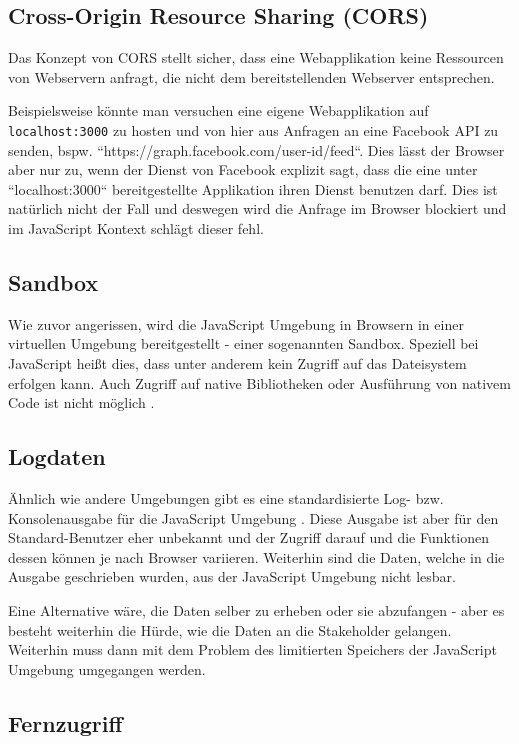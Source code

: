 \subsection{Cross-Origin Resource Sharing (CORS)}

Das Konzept von CORS stellt sicher, dass eine Webapplikation keine Ressourcen von Webservern anfragt, die nicht dem bereitstellenden Webserver entsprechen.

Beispielsweise könnte man versuchen eine eigene Webapplikation auf \texttt{localhost:3000} zu hosten und von hier aus Anfragen an eine Facebook API zu senden, bspw. ``https://graph.facebook.com/{user-id}/feed``. Dies lässt der Browser aber nur zu, wenn der Dienst von Facebook explizit sagt, dass die eine unter ``localhost:3000`` bereitgestellte Applikation ihren Dienst benutzen darf. Dies ist natürlich nicht der Fall und deswegen wird die Anfrage im Browser blockiert und im JavaScript Kontext schlägt dieser fehl.

\subsection{Sandbox}

Wie zuvor angerissen, wird die JavaScript Umgebung in Browsern in einer virtuellen Umgebung bereitgestellt - einer sogenannten Sandbox. Speziell bei JavaScript heißt dies, dass unter anderem kein Zugriff auf das Dateisystem erfolgen kann. Auch Zugriff auf native Bibliotheken oder Ausführung von nativem Code ist nicht möglich \cite{TheSpyInTheSandbox}.

\subsection{Logdaten}

Ähnlich wie andere Umgebungen gibt es eine standardisierte Log- bzw. Konsolenausgabe für die JavaScript Umgebung \cite{MDNConsole}. Diese Ausgabe ist aber für den Standard-Benutzer eher unbekannt und der Zugriff darauf und die Funktionen dessen können je nach Browser variieren. Weiterhin sind die Daten, welche in die Ausgabe geschrieben wurden, aus der JavaScript Umgebung nicht lesbar.

Eine Alternative wäre, die Daten selber zu erheben oder sie abzufangen - aber es besteht weiterhin die Hürde, wie die Daten an die Stakeholder gelangen. Weiterhin muss dann mit dem Problem des limitierten Speichers der JavaScript Umgebung umgegangen werden.

\subsection{Fernzugriff}

